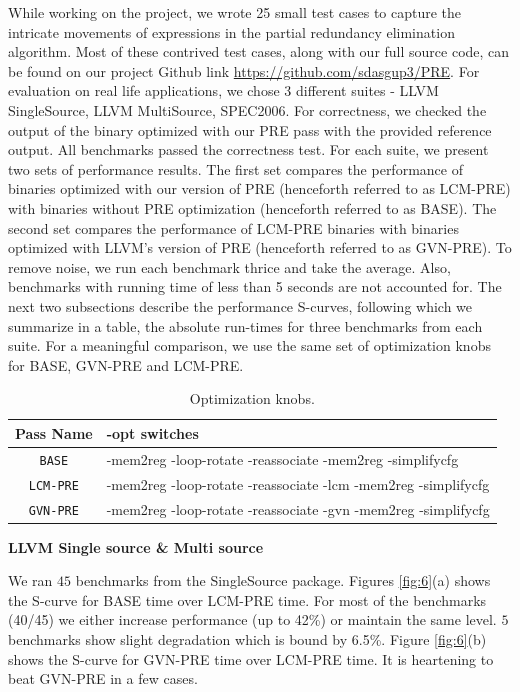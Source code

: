 \documentclass[10pt,twoside]{report}
\begin{document}
While working on the project, we wrote 25 small test cases to capture the intricate movements
of expressions in the partial redundancy elimination algorithm. Most of these contrived test cases, along with our full source code, 
can be found on our project Github link \url{https://github.com/sdasgup3/PRE}. For evaluation on real life applications, we
chose 3 different suites - LLVM SingleSource, LLVM MultiSource, SPEC2006. For correctness, we checked the 
output of the binary optimized with our PRE pass with the provided reference output. All benchmarks passed the 
correctness test. For each suite, we present two sets of performance results. The first set compares the performance
of binaries optimized with our version of PRE (henceforth referred to as LCM-PRE) with binaries without PRE
optimization (henceforth referred to as BASE). The second set compares the
performance of LCM-PRE binaries with binaries optimized with LLVM's version of
PRE (henceforth referred to as GVN-PRE). To remove noise, we run each benchmark
thrice and take the average. Also, benchmarks with running time of less than 5
seconds are not accounted for. The next two subsections describe the
performance S-curves, following which we summarize in a table, the absolute
run-times for three benchmarks from each suite. For a meaningful comparison,
we use the same set of optimization knobs for BASE, GVN-PRE and LCM-PRE.

\begin{table}[h]
\centering
\begin{tabular}{|c|l|}
\hline
Pass Name & \qquad \quad \quad \quad \quad \quad \quad \quad \quad -opt switches                                                  \\ \hline \hline
\texttt{BASE}  & -mem2reg -loop-rotate -reassociate      -mem2reg -simplifycfg      \\ \hline
\texttt{LCM-PRE}   & -mem2reg -loop-rotate -reassociate -lcm -mem2reg -simplifycfg \\ \hline
\texttt{GVN-PRE}   & -mem2reg -loop-rotate -reassociate -gvn -mem2reg -simplifycfg \\ \hline
\end{tabular}
\caption{Optimization knobs.} \label{tab:1}
\end{table}

\begin{flushleft}
\textbf{\normalsize{LLVM Single source \& Multi source}}
\end{flushleft}

We ran $45$ benchmarks from the SingleSource package. Figures \ref{fig:6}(a)
shows the S-curve for BASE time over LCM-PRE time. For most of the
benchmarks (40/45) we either increase performance (up to 42\%) or maintain the
same level. $5$ benchmarks show slight degradation which is bound by 6.5\%.
Figure \ref{fig:6}(b) shows the S-curve for GVN-PRE time over LCM-PRE time. It is
heartening to beat GVN-PRE in a few cases. 
\end{document}

